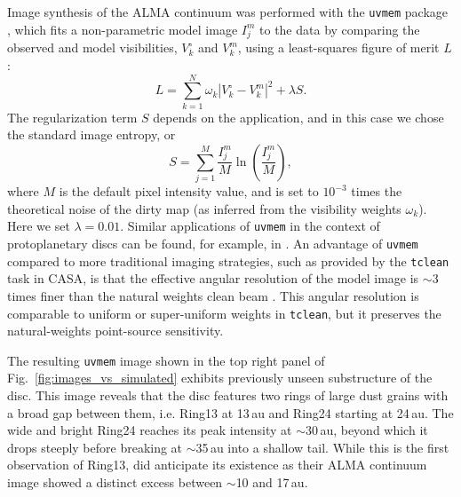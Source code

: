 \documentclass[usenatbib,times]{mnras}
\begin{document}
Image synthesis of the ALMA continuum was performed with  the {\tt uvmem} package \citep{2006ApJ...639..951C, 2018A&C....22...16C}, which fits a non-parametric model image $I^m_j$ to the data by comparing the  observed  and model visibilities, $V^\circ_k$ and $V^m_k$, using a least-squares figure of merit $L$:
\begin{equation}
  L = \sum_{k=1}^N \omega_k  |V^\circ_k - V^m_k|^2 + \lambda S.
\end{equation}
The regularization term $S$ depends on the application, and in this case we chose the standard image entropy, or
\begin{equation}
S = \sum_{j=1}^M \frac{I_j^m}{M} \ln\left(\frac{I_j^m}{M}\right),
\end{equation}
where $M$ is the default pixel intensity value, and is set to $10^{-3}$ times the theoretical noise of the dirty map (as inferred from the visibility weights $\omega_k$). Here we set $\lambda = 0.01$.  Similar applications of {\tt uvmem} in the context of protoplanetary discs can be found, for example,  in \citet{Casassus2013Natur, 2018MNRAS.477.5104C, Casassus2019MNRAS.483.3278C,  Perez2019AJ....158...15P}.  An  advantage of {\tt uvmem} compared to more traditional imaging strategies, such as provided by the  {\tt tclean}   task in CASA, is that the effective angular resolution of the model image is  $\sim$3 times finer than the natural weights clean beam \citep[][]{2018A&C....22...16C}. This angular resolution is comparable to  uniform or super-uniform weights in {\tt tclean}, but it preserves the natural-weights point-source sensitivity. 

The resulting {\tt uvmem} image shown in the top right panel of Fig.~\ref{fig:images_vs_simulated} exhibits previously unseen substructure of the disc. This image reveals that the disc features two rings of large dust grains with a broad gap between them, i.e. Ring13 at 13\,au and Ring24 starting at 24\,au. The wide and bright Ring24 reaches its peak intensity at $\sim$30\,au, beyond which it drops steeply before breaking at $\sim$35\,au into a shallow tail. While this is the first observation of Ring13, \citet{Ru_z_Rodr_guez_2019} did anticipate its existence as their ALMA continuum image showed a distinct excess between $\sim$10 and 17\,au.
\end{document}
